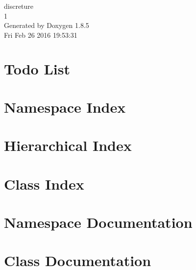 \documentclass[twoside]{book}
\newcommand{\clearemptydoublepage}{%
  \newpage{\pagestyle{empty}\cleardoublepage}%
}
\begin{document}
\hypersetup{pageanchor=false}
\begin{titlepage}
\vspace*{7cm}
\begin{center}%
{\Large discreture \\[1ex]\large 1 }\\
\vspace*{1cm}
{\large Generated by Doxygen 1.8.5}\\
\vspace*{0.5cm}
{\small Fri Feb 26 2016 19:53:31}\\
\end{center}
\end{titlepage}
\clearemptydoublepage
\tableofcontents
\clearemptydoublepage
{}
\hypersetup{pageanchor=true}

\chapter{Todo List}
\label{todo}
\hypertarget{todo}{}

\chapter{Namespace Index}

\chapter{Hierarchical Index}

\chapter{Class Index}

\chapter{Namespace Documentation}

\chapter{Class Documentation}
























\newpage
{}
{}
\printindex
\end{document}
